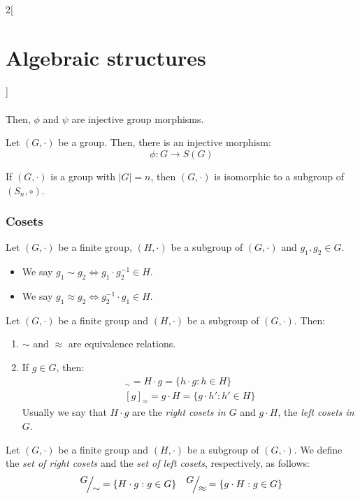 \documentclass[../../../main.tex]{subfiles}
\begin{document}
\begin{multicols}{2}[\section{Algebraic structures}]
\begin{prop}
\begin{align*}
    \end{align*}
    Then, $\phi$ and $\psi$ are injective group morphisms.
\end{prop}
\begin{theorem}
    Let $(G,\cdot)$ be a group. Then, there is an injective morphism: $$\phi:G\longrightarrow S(G)$$
\end{theorem}
\begin{corollary}
    If $(G,\cdot)$ is a group with $|G|=n$, then $(G,\cdot)$ is isomorphic to a subgroup of $(S_n,\circ)$.
\end{corollary}
\subsubsection{Cosets}
\begin{definition}\label{AS_equiv} 
    Let $(G,\cdot)$ be a finite group, $(H,\cdot)$ be a subgroup of $(G,\cdot)$ and $g_1,g_2\in G$. 
    \begin{itemize}
        \item We say $g_1\sim g_2\iff g_1\cdot g_2^{-1}\in H$.
        \item We say $g_1\approx g_2\iff g_2^{-1}\cdot g_1\in H$.
    \end{itemize}
\end{definition}
\begin{lemma}
    Let $(G,\cdot)$ be a finite group and $(H,\cdot)$ be a subgroup of $(G,\cdot)$. Then:
    \begin{enumerate}
        \item $\sim$ and $\approx$ are equivalence relations.
        \item If $g\in G$, then:
        \begin{gather*}
            [g]_\sim=H\cdot g=\{h\cdot g:h\in H\}\\ [g]_\approx=g\cdot H=\{g\cdot h':h'\in H\}
        \end{gather*}
        Usually we say that $H\cdot g$ are the \textit{right cosets in $G$} and $g\cdot H$, the \textit{left cosets in $G$}. 
    \end{enumerate}
\end{lemma}
\begin{definition}
    Let $(G,\cdot)$ be a finite group and $(H,\cdot)$ be a subgroup of $(G,\cdot)$. We define the \textit{set of right cosets} and the \textit{set of left cosets}, respectively, as follows:
    $$\quot{G}{\sim}=\{H\cdot g:g\in G\}\quad\quot{G}{\approx}=\{g\cdot H:g\in G\}$$
\end{definition}

\end{multicols}
\end{document}
